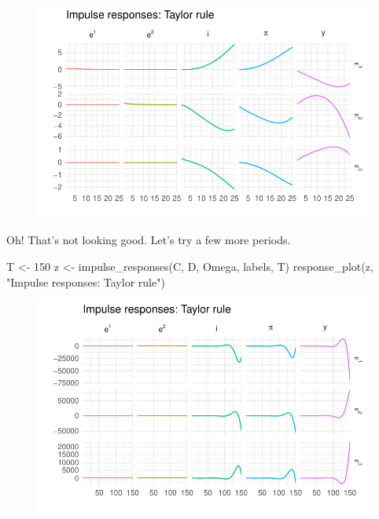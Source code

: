 \documentclass[
  letterpaper,
]{book}
\newenvironment{Shaded}{\begin{snugshade}}{\end{snugshade}}
\newcommand{\DecValTok}[1]{\textcolor[rgb]{0.68,0.00,0.00}{#1}}
\newcommand{\FunctionTok}[1]{\textcolor[rgb]{0.28,0.35,0.67}{#1}}
\newcommand{\NormalTok}[1]{\textcolor[rgb]{0.00,0.23,0.31}{#1}}
\newcommand{\OtherTok}[1]{\textcolor[rgb]{0.00,0.23,0.31}{#1}}
\newcommand{\StringTok}[1]{\textcolor[rgb]{0.13,0.47,0.30}{#1}}
\begin{document}
\begin{figure}[H]

{\centering \includegraphics{BK_files/figure-pdf/unnamed-chunk-4-1.pdf}

}

\end{figure}

Oh! That's not looking good. Let's try a few more periods.

\begin{Shaded}
\begin{Highlighting}[]
\NormalTok{T }\OtherTok{\textless{}{-}} \DecValTok{150}
\NormalTok{z }\OtherTok{\textless{}{-}} \FunctionTok{impulse\_responses}\NormalTok{(C, D, Omega, labels, T)}
\FunctionTok{response\_plot}\NormalTok{(z, }\StringTok{"Impulse responses: Taylor rule"}\NormalTok{)}
\end{Highlighting}
\end{Shaded}

\begin{figure}[H]

{\centering \includegraphics{BK_files/figure-pdf/unnamed-chunk-5-1.pdf}

}

\end{figure}
\end{document}
